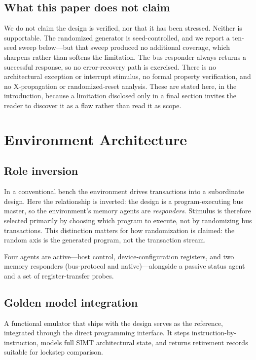 \documentclass[conference]{IEEEtran}
\begin{document}
\subsection{What this paper does not claim}
\label{sec:notclaim}
We do not claim the design is verified, nor that it has been stressed.
Neither is supportable. The randomized generator is seed-controlled, and we
report a ten-seed sweep below---but that sweep produced no additional
coverage, which sharpens rather than softens the limitation. The bus responder always
returns a successful response, so no error-recovery path is exercised.
There is no architectural exception or interrupt stimulus, no formal
property verification, and no X-propagation or randomized-reset analysis.
These are stated here, in the introduction, because a limitation disclosed
only in a final section invites the reader to discover it as a flaw rather
than read it as scope.

\section{Environment Architecture}

\subsection{Role inversion}
In a conventional bench the environment drives transactions into a
subordinate design. Here the relationship is inverted: the design is a
program-executing bus master, so the environment's memory agents are
\emph{responders}. Stimulus is therefore selected primarily by choosing
which program to execute, not by randomizing bus transactions. This
distinction matters for how randomization is claimed: the random axis is
the generated program, not the transaction stream.

Four agents are active---host control, device-configuration registers,
and two memory responders (bus-protocol and native)---alongside a passive
status agent and a set of register-transfer probes.

\subsection{Golden model integration}
A functional emulator that ships with the design serves as the reference,
integrated through the direct programming interface. It steps
instruction-by-instruction, models full SIMT architectural state, and
returns retirement records suitable for lockstep comparison.
\end{document}
